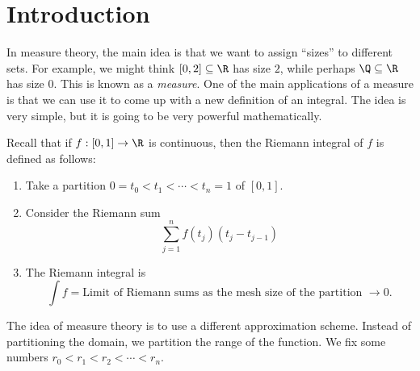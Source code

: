 \documentclass[a4paper]{article}
\begin{document}
\tableofcontents
\setcounter{section}{-1}
\section{Introduction}
In measure theory, the main idea is that we want to assign ``sizes'' to different sets. For example, we might think $[0, 2] \subseteq \R$ has size $2$, while perhaps $\Q \subseteq \R$ has size $0$. This is known as a \emph{measure}. One of the main applications of a measure is that we can use it to come up with a new definition of an integral. The idea is very simple, but it is going to be very powerful mathematically.

Recall that if $f: [0, 1] \to \R$ is continuous, then the Riemann integral of $f$ is defined as follows:
\begin{enumerate}
  \item Take a partition $0 = t_0 < t_1 < \cdots < t_n = 1$ of $[0, 1]$.
  \item Consider the Riemann sum
    \[
      \sum_{j = 1}^n f(t_j) (t_j - t_{j - 1})
    \]
  \item The Riemann integral is
    \[
      \int f = \text{Limit of Riemann sums as the mesh size of the partition }\to 0.
    \]
\end{enumerate}
\begin{center}
\end{center}
The idea of measure theory is to use a different approximation scheme. Instead of partitioning the domain, we partition the range of the function. We fix some numbers $r_0 < r_1 < r_2 < \cdots < r_n$.
\end{document}
